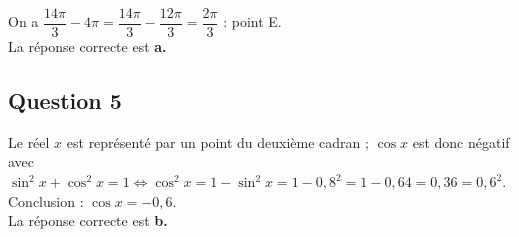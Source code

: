 \documentclass[10pt]{article}
\begin{document}
On a $\dfrac{14\pi}{3} - 4\pi = \dfrac{14\pi}{3} - \dfrac{12\pi}{3} = \dfrac{2\pi}{3}$ : point E.\\
La réponse correcte est \textbf{a.}
	
	\subsection*{Question 5}
	
Le réel $x$ est représenté par un point du deuxième cadran ; $\cos x$ est donc négatif avec $\sin^2 x + \cos^2 x = 1 \Leftrightarrow \cos^2 x = 1 - \sin^2 x = 1 - 0,8^2 = 1 - 0,64 = 0,36 = 0,6^2$. Conclusion : $\cos x = -0,6$.\\
La réponse correcte est \textbf{b.}
\end{document}
